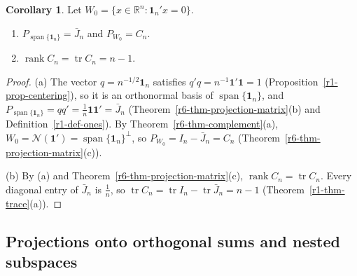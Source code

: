 \documentclass[12pt]{article}
\newcommand{\R}{\mathbb R}
\newcommand{\one}{\mathbf 1}
\DeclareMathOperator{\tr}{tr}
\DeclareMathOperator{\rank}{rank}
\DeclareMathOperator{\Span}{span}
\theoremstyle{definition}
\newtheorem{corollary}[theorem]{Corollary}
\begin{document}
\begin{corollary}\label{r6-cor-centering}
Let \(W_0=\{x\in\R^n:\one_n'x=0\}\).
\begin{enumerate}
\item \(P_{\Span\{\one_n\}}=\bar J_n\) and \(P_{W_0}=C_n\).
\item \(\rank C_n=\tr C_n=n-1\).
\end{enumerate}
\end{corollary}
\begin{proof}
(a) The vector \(q=n^{-1/2}\one_n\) satisfies \(q'q=n^{-1}\one'\one=1\) (Proposition~\ref{r1-prop-centering}), so it
is an orthonormal basis of \(\Span\{\one_n\}\), and \(P_{\Span\{\one_n\}}=qq'=\frac1n\one\one'=\bar J_n\)
(Theorem~\ref{r6-thm-projection-matrix}(b) and Definition~\ref{r1-def-ones}). By
Theorem~\ref{r6-thm-complement}(a), \(W_0=\mathcal N(\one')=\Span\{\one_n\}^\perp\), so
\(P_{W_0}=I_n-\bar J_n=C_n\) (Theorem~\ref{r6-thm-projection-matrix}(c)).

(b) By (a) and Theorem~\ref{r6-thm-projection-matrix}(c), \(\rank C_n=\tr C_n\). Every diagonal entry of
\(\bar J_n\) is \(\frac1n\), so \(\tr C_n=\tr I_n-\tr\bar J_n=n-1\) (Theorem~\ref{r1-thm-trace}(a)).
\end{proof}

\subsection*{Projections onto orthogonal sums and nested subspaces}
\end{document}
